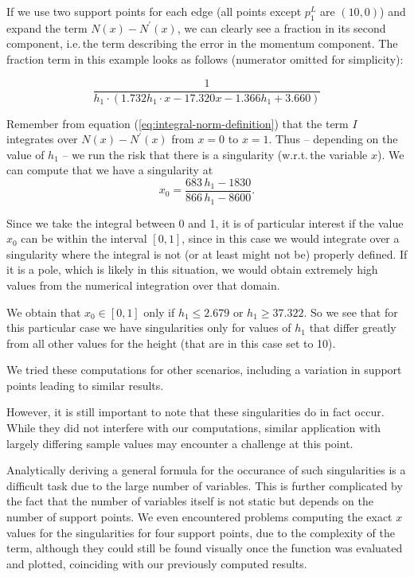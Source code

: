 \documentclass{article}
\begin{document}
If we use two support points for each edge (all points except $p_1^L$ are $(10,0)$) and expand the term $N\left(x\right)-N^\prime\left(x\right)$, we can clearly see a fraction in its second component, i.e.\,the term describing the error in the momentum component. The fraction term in this example looks as follows (numerator omitted for simplicity):

\begin{equation*}
  \frac{1}{h_1\cdot(1.732 h_1 \cdot x - 17.320 x - 1.366 h_1 + 3.660)}
\end{equation*}

Remember from equation (\ref{eq:integral-norm-definition}) that the term $I$ integrates over $N\left(x\right)-N^\prime\left(x\right)$ from $x=0$ to $x=1$. Thus -- depending on the value of $h_1$ -- we run the risk that there is a singularity (w.r.t.\,the variable $x$). We can compute that we have a singularity at
\begin{equation*}
  x_0=\frac{683\, h_1 - 1830}{866\, h_1 - 8600}.
\end{equation*}

Since we take the integral between 0 and 1, it is of particular interest if the value $x_0$ can be within the interval $\left[ 0,1 \right]$, since in this case we would integrate over a singularity where the integral is not (or at least might not be) properly defined. If it is a pole, which is likely in this situation, we would obtain extremely high values from the numerical integration over that domain.

We obtain that $x_0 \in \left[ 0,1 \right]$ only if $h_1 \leq 2.679$ or $h_1 \geq 37.322$. So we see that for this particular case we have singularities only for values of $h_1$ that differ greatly from all other values for the height (that are in this case set to 10).

We tried these computations for other scenarios, including a variation in support points leading to similar results.

However, it is still important to note that these singularities do in fact occur. While they did not interfere with our computations, similar application with largely differing sample values may encounter a challenge at this point.

Analytically deriving a general formula for the occurance of such singularities is a difficult task due to the large number of variables. This is further complicated by the fact that the number of variables itself is not static but depends on the number of support points. We even encountered problems computing the exact $x$ values for the singularities for four support points, due to the complexity of the term, although they could still be found visually once the function was evaluated and plotted, coinciding with our previously computed results.
\end{document}
